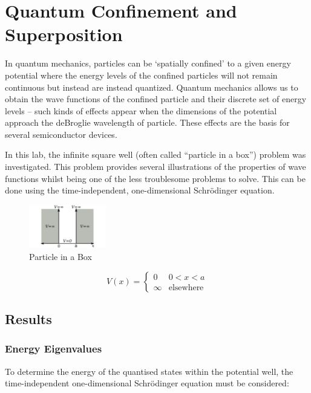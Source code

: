 \renewcommand{\chaptername}{Feb 8th: Lab}
\chapter{Quantum Confinement and Superposition}
In quantum mechanics, particles can be `spatially confined' to a given energy potential where the energy levels of the confined particles will not remain continuous but instead are instead quantized.
Quantum mechanics allows us to obtain the wave functions of the confined particle and their discrete set of energy levels -- such kinds of effects appear when the dimensions of the potential approach the deBroglie wavelength of particle. These effects are the basis for several semiconductor devices.

In this lab, the infinite square well (often called ``particle in a box'') problem was investigated. This problem provides several illustrations of the properties of wave functions whilst being one of the less troublesome problems to solve. This can be done using the time-independent, one-dimensional Schrödinger equation.

\begin{figure}[h]
    \centering
    \includegraphics[width=0.3\textwidth]{lab1/images/pIAB.png}
    \caption{Particle in a Box}
    \label{fig:particleInABox}
\end{figure}

\[
  V(x) = \begin{cases}
  0 & 0 < x < a\\
  \infty & \text{elsewhere}
\end{cases}
\]
   
\section{Results}
\subsection{Energy Eigenvalues}
To determine the energy of the quantised states within the potential well, the time-independent one-dimensional Schrödinger equation must be considered:

